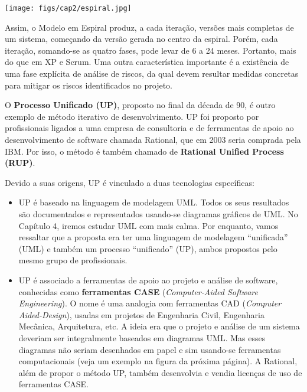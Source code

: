 \documentclass[
  11pt,
  twoside]{book}
\let\origfigure\figure
\let\endorigfigure\endfigure
\renewenvironment{figure}[1][2] {
    \expandafter\origfigure\expandafter[!h]
} {
    \endorigfigure
}
\begin{document}
\begin{figure}
\centering
\texttt{[image: figs/cap2/espiral.jpg]}
\caption{Modelo Espiral. Cada iteração é dividida em quatro etapas.}
\end{figure}

Assim, o Modelo em Espiral produz, a cada iteração, versões mais
completas de um sistema, começando da versão gerada no centro da
espiral. Porém, cada iteração, somando-se as quatro fases, pode levar de
6 a 24 meses. Portanto, mais do que em XP e Scrum. Uma outra
característica importante é a existência de uma fase explícita de
análise de riscos, da qual devem resultar medidas concretas para mitigar
os riscos identificados no projeto.

  
 O \textbf{Processo Unificado
(UP)}, proposto no final da década de 90, é outro exemplo de método
iterativo de desenvolvimento. UP foi proposto por profissionais ligados
a uma empresa de consultoria e de ferramentas de apoio ao
desenvolvimento de software chamada Rational, que em 2003 seria comprada
pela IBM. Por isso, o método é também chamado de \textbf{Rational
Unified Process (RUP)}.

Devido a suas origens, UP é vinculado a duas tecnologias específicas:

\begin{itemize}
\item
  UP é baseado na linguagem de modelagem UML. Todos os seus resultados
  são documentados e representados usando-se diagramas gráficos de UML.
  No Capítulo 4, iremos estudar UML com mais calma. Por enquanto, vamos
  ressaltar que a proposta era ter uma linguagem de modelagem
  ``unificada'' (UML) e também um processo ``unificado'' (UP), ambos
  propostos pelo mesmo grupo de profissionais.
\item
  UP é associado a ferramentas de apoio ao projeto e análise de
  software, conhecidas como \textbf{ferramentas CASE}
  (\emph{Computer-Aided Software Engineering}).
   O nome é uma
  analogia com ferramentas CAD (\emph{Computer Aided-Design}), usadas em
  projetos de Engenharia Civil, Engenharia Mecânica, Arquitetura, etc. A
  ideia era que o projeto e análise de um sistema deveriam ser
  integralmente baseados em diagramas UML. Mas esses diagramas não
  seriam desenhados em papel e sim usando-se ferramentas computacionais
  (veja um exemplo na figura da próxima página). A Rational, além de
  propor o método UP, também desenvolvia e vendia licenças de uso de
  ferramentas CASE.
\end{itemize}
\end{document}
